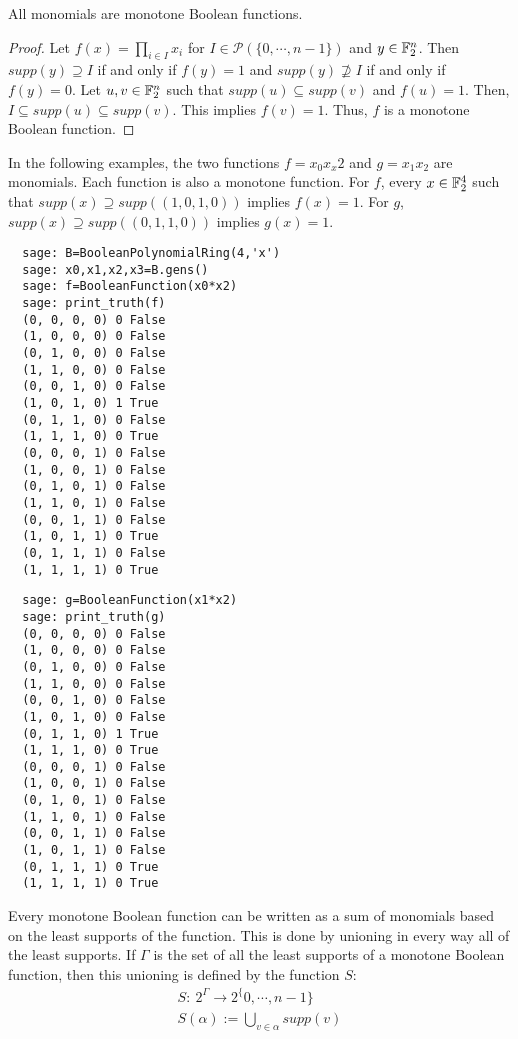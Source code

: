 \begin{theorem}
  All monomials are monotone Boolean functions.
\end{theorem}

\begin{proof}
  Let $f(x)=\prod_{i\in I}x_i$ for $I\in\mathcal{P}(\{0,\cdots,n-1\})$ and
  $y\in\mathbb{F}_2^n$. Then $supp(y)\supseteq I$ if and only if $f(y)=1$ and
  $supp(y) \not\supseteq I$ if and only if $f(y)=0$.
  Let $u,v\in\mathbb{F}_2^n$ such that $supp(u)\subseteq supp(v)$ and $f(u)=1$.
  Then, $I\subseteq supp(u) \subseteq supp(v)$. This implies $f(v)=1$. Thus,
  $f$ is a monotone Boolean function.
\end{proof}

\begin{example}
  In the following examples, the two functions $f=x_0x_x2$ and $g=x_1x_2$
  are monomials. Each function is also a monotone function. For $f$, every
  $x\in\mathbb{F}_2^4$ such that $supp(x)\supseteq supp((1,0,1,0))$ implies
  $f(x)=1$. For $g$, $supp(x)\supseteq supp( (0,1,1,0) )$ implies $g(x)=1$.
  \begin{verbatim}
  sage: B=BooleanPolynomialRing(4,'x')
  sage: x0,x1,x2,x3=B.gens()
  sage: f=BooleanFunction(x0*x2)
  sage: print_truth(f)
  (0, 0, 0, 0) 0 False
  (1, 0, 0, 0) 0 False
  (0, 1, 0, 0) 0 False
  (1, 1, 0, 0) 0 False
  (0, 0, 1, 0) 0 False
  (1, 0, 1, 0) 1 True
  (0, 1, 1, 0) 0 False
  (1, 1, 1, 0) 0 True
  (0, 0, 0, 1) 0 False
  (1, 0, 0, 1) 0 False
  (0, 1, 0, 1) 0 False
  (1, 1, 0, 1) 0 False
  (0, 0, 1, 1) 0 False
  (1, 0, 1, 1) 0 True
  (0, 1, 1, 1) 0 False
  (1, 1, 1, 1) 0 True
  \end{verbatim}

  \begin{verbatim}
  sage: g=BooleanFunction(x1*x2)
  sage: print_truth(g)
  (0, 0, 0, 0) 0 False
  (1, 0, 0, 0) 0 False
  (0, 1, 0, 0) 0 False
  (1, 1, 0, 0) 0 False
  (0, 0, 1, 0) 0 False
  (1, 0, 1, 0) 0 False
  (0, 1, 1, 0) 1 True
  (1, 1, 1, 0) 0 True
  (0, 0, 0, 1) 0 False
  (1, 0, 0, 1) 0 False
  (0, 1, 0, 1) 0 False
  (1, 1, 0, 1) 0 False
  (0, 0, 1, 1) 0 False
  (1, 0, 1, 1) 0 False
  (0, 1, 1, 1) 0 True
  (1, 1, 1, 1) 0 True
  \end{verbatim}
\end{example}

\par Every monotone Boolean function can be written as a sum of monomials
based on the least supports of the function. This is done by unioning in
every way all of the least supports. If $\Gamma$ is the set of all the least
supports of a monotone Boolean function, then this unioning is defined by
the function $S$:
\begin{align}
  S:\ 2^\Gamma \rightarrow 2^\{0,\cdots,n-1\} \\
  S(\alpha):=\bigcup_{v\in\alpha}supp(v)
\end{align}

